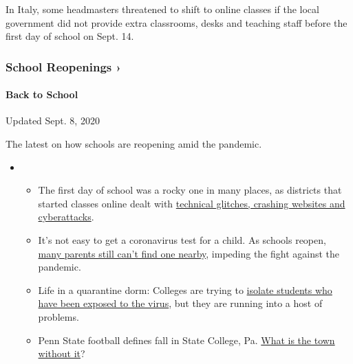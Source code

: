 In Italy, some headmasters threatened to shift to online classes if the
local government did not provide extra classrooms, desks and teaching
staff before the first day of school on Sept. 14.

\href{https://www.nytimes3xbfgragh.onion/spotlight/schools-reopening?action=click\&pgtype=Article\&state=default\&region=MAIN_CONTENT_3\&context=storylines_keepup}{}

\hypertarget{school-reopenings-}{%
\subsubsection{School Reopenings ›}\label{school-reopenings-}}

\hypertarget{back-to-school}{%
\paragraph{Back to School}\label{back-to-school}}

Updated Sept. 8, 2020

The latest on how schools are reopening amid the pandemic.

\begin{itemize}
\item
  \begin{itemize}
  \tightlist
  \item
    The first day of school was a rocky one in many places, as districts
    that started classes online dealt with
    \href{https://www.nytimes3xbfgragh.onion/2020/09/08/us/school-districts-cyberattacks-glitches.html?action=click\&pgtype=Article\&state=default\&region=MAIN_CONTENT_3\&context=storylines_keepup}{technical
    glitches, crashing websites and cyberattacks}.
  \item
    It's not easy to get a coronavirus test for a child. As schools
    reopen,
    \href{https://www.nytimes3xbfgragh.onion/2020/09/08/upshot/children-testing-shortfalls-virus.html?action=click\&pgtype=Article\&state=default\&region=MAIN_CONTENT_3\&context=storylines_keepup}{many
    parents still can't find one nearby}, impeding the fight against the
    pandemic.
  \item
    Life in a quarantine dorm: Colleges are trying to
    \href{https://www.nytimes3xbfgragh.onion/2020/09/09/business/colleges-coronavirus-dormitories-quarantine.html?action=click\&pgtype=Article\&state=default\&region=MAIN_CONTENT_3\&context=storylines_keepup}{isolate
    students who have been exposed to the virus}, but they are running
    into a host of problems.
  \item
    Penn State football defines fall in State College, Pa.
    \href{https://www.nytimes3xbfgragh.onion/2020/09/09/sports/penn-state-college-football-canceled.html?action=click\&pgtype=Article\&state=default\&region=MAIN_CONTENT_3\&context=storylines_keepup}{What
    is the town without it}?
  \end{itemize}
\end{itemize}

